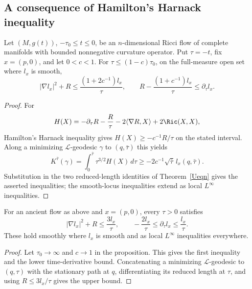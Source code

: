 \subsection{A consequence of Hamilton's Harnack inequality}

\begin{proposition}\label{prop:harnack-l-function-lipschitz-bound}
\label{uniformlip}
Let $(M,g(t))$, $-\tau_0\leq t\leq0$, be an $n$-dimensional Ricci
flow of complete manifolds with bounded nonnegative curvature
operator. Put $\tau=-t$, fix $x=(p,0)$, and let $0<c<1$. For
$\tau\leq(1-c)\tau_0$, on the full-measure open set where $l_x$ is
smooth,
\[
 |\nabla l_x|^2+R\leq\frac{(1+2c^{-1})l_x}{\tau},
 \qquad
 R-\frac{(1+c^{-1})l_x}{\tau}\leq\partial_\tau l_x.
\]
\end{proposition}
\begin{proof}
\sketch For
\[
 H(X)=-\partial_\tau R-\frac R\tau-2\langle\nabla R,X\rangle
       +2\Ric(X,X),
\]
Hamilton's Harnack inequality gives
$H(X)\geq-c^{-1}R/\tau$ on the stated interval. Along a minimizing
$\mathcal L$-geodesic $\gamma$ to $(q,\bar\tau)$ this yields
\begin{equation}\label{Kbartaueqn}
 K^{\bar\tau}(\gamma)
 =\int_0^{\bar\tau}\tau^{3/2}H(X)\,d\tau
 \geq-2c^{-1}\sqrt{\bar\tau}\,l_x(q,\bar\tau).
\end{equation}
Substitution in the two reduced-length identities of
Theorem~\ref{Ueqn} gives the asserted inequalities; the smooth-locus
inequalities extend as local $L^\infty$ inequalities.
\end{proof}

\begin{corollary}\label{cor:l-function-gradient-bound}
\label{unianc}
For an ancient flow as above and $x=(p,0)$, every $\tau>0$ satisfies
\[
 |\nabla l_x|^2+R\leq\frac{3l_x}{\tau},
 \qquad
 -\frac{2l_x}{\tau}\leq\partial_\tau l_x
 \leq\frac{l_x}{\tau}.
\]
These hold smoothly where $l_x$ is smooth and as local
$L^\infty$ inequalities everywhere.
\end{corollary}
\begin{proof}
\sketch
{}
Let $\tau_0\to\infty$ and $c\to1$ in the proposition. This gives the
first inequality and the lower time-derivative bound. Concatenating
a minimizing $\mathcal L$-geodesic to $(q,\tau)$ with the stationary
path at $q$, differentiating its reduced length at $\tau$, and using
$R\leq3l_x/\tau$ gives the upper bound.
\end{proof}

